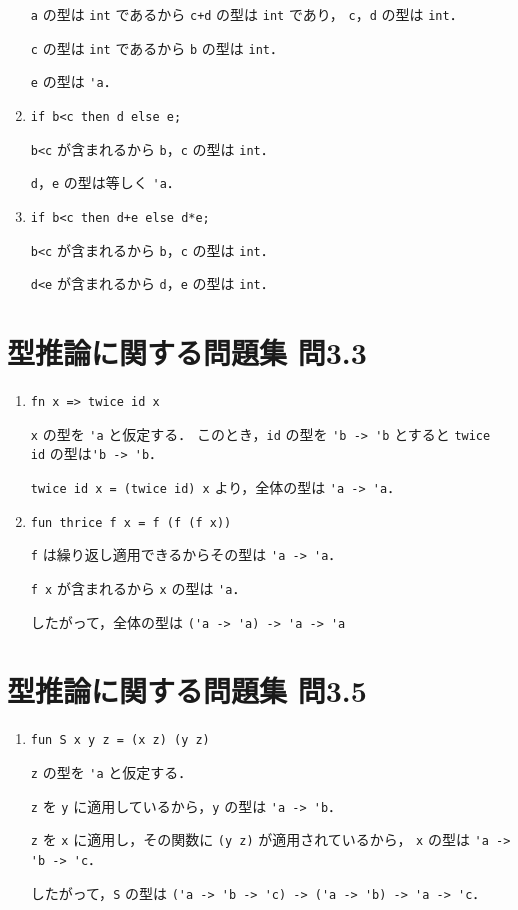\documentclass[a4paper, lualatex, ja=standard]{bxjsarticle}
\begin{document}
\begin{enumerate}[label=\alph*)]
  \verb|a| の型は \verb|int| であるから \verb|c+d| の型は \verb|int| であり，
  \verb|c|，\verb|d| の型は \verb|int|．

  \verb|c| の型は \verb|int| であるから \verb|b| の型は \verb|int|．

  \verb|e| の型は \verb|'a|．

\item \verb|if b<c then d else e;|

  \verb|b<c| が含まれるから \verb|b|，\verb|c| の型は \verb|int|．

  \verb|d|，\verb|e| の型は等しく \verb|'a|．

\item \verb|if b<c then d+e else d*e;|

  \verb|b<c| が含まれるから \verb|b|，\verb|c| の型は \verb|int|．

  \verb|d<e| が含まれるから \verb|d|，\verb|e| の型は \verb|int|．
\end{enumerate}

\section{型推論に関する問題集 問3.3}

\begin{enumerate}[label=\arabic*., start=2]
\item \verb|fn x => twice id x|

  \verb|x| の型を \verb|'a| と仮定する．
  このとき，\verb|id| の型を \verb|'b -> 'b| とすると
  \verb|twice id| の型は\verb|'b -> 'b|．

  \verb|twice id x = (twice id) x| より，全体の型は \verb|'a -> 'a|．

\item \verb|fun thrice f x = f (f (f x))|

  \verb|f| は繰り返し適用できるからその型は \verb|'a -> 'a|．

  \verb|f x| が含まれるから \verb|x| の型は \verb|'a|．

  したがって，全体の型は \verb|('a -> 'a) -> 'a -> 'a|
\end{enumerate}

\section{型推論に関する問題集 問3.5}
\begin{enumerate}[label=\arabic*, start=3]
\item \verb|fun S x y z = (x z) (y z)|

  \verb|z| の型を \verb|'a| と仮定する．

  \verb|z| を \verb|y| に適用しているから，\verb|y| の型は \verb|'a -> 'b|．

  \verb|z| を \verb|x| に適用し，その関数に \verb|(y z)| が適用されているから，
  \verb|x| の型は \verb|'a -> 'b -> 'c|．

  したがって，\verb|S| の型は \verb|('a -> 'b -> 'c) -> ('a -> 'b) -> 'a -> 'c|．
\end{enumerate}
\end{document}
